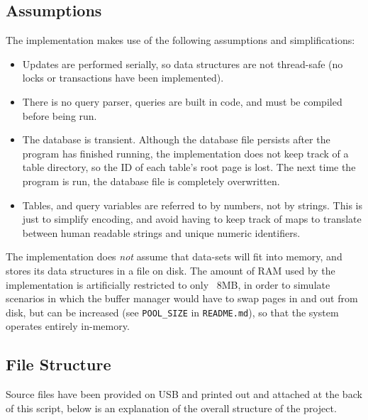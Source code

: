 \subsection{Assumptions}\label{sec:q-2-ass}

The implementation makes use of the following assumptions and simplifications:

\begin{itemize}
  \item Updates are performed serially, so data structures are not thread-safe (no locks or transactions have been implemented).
  \item There is no query parser, queries are built in code, and must be compiled before being run.
  \item The database is transient. Although the database file persists after the program has finished running, the implementation does not keep track of a table directory, so the ID of each table's root page is lost. The next time the program is run, the database file is completely overwritten.
  \item Tables, and query variables are referred to by numbers, not by strings. This is just to simplify encoding, and avoid having to keep track of maps to translate between human readable strings and unique numeric identifiers.
\end{itemize}

The implementation does \textit{not} assume that data-sets will fit into memory, and stores its data structures in a file on disk. The amount of RAM used by the implementation is artificially restricted to only ~8MB, in order to simulate scenarios in which the buffer manager would have to swap pages in and out from disk, but can be increased (see \texttt{POOL\_SIZE} in \texttt{README.md}), so that the system operates entirely in-memory.

\subsection{File Structure}\label{sec:q-2-struct}

Source files have been provided on USB and printed out and attached at the back of this script, below is an explanation of the overall structure of the project.

